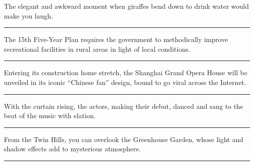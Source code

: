\documentclass[11pt,a4paper]{article}
\newcommand{\num}[1]{\makebox[1.9em][r]{#1.}\hspace{0.3em}}
\newcommand{\wline}{\noindent\rule{\linewidth}{0.4pt}}
\begin{document}
\begin{minipage}{\linewidth}

\num{34}The elegant and awkward moment when giraffes bend down to drink water would make you laugh.

\vspace{0.25em}

\wline

\end{minipage}

\begin{minipage}{\linewidth}

\num{35}The 15th Five-Year Plan requires the government to methodically improve recreational facilities in rural areas in light of local conditions.

\vspace{0.25em}

\wline

\end{minipage}

\begin{minipage}{\linewidth}

\num{36}Entering its construction home stretch, the Shanghai Grand Opera House will be unveiled in its iconic “Chinese fan” design, bound to go viral across the Internet.

\vspace{0.25em}

\wline

\end{minipage}

\vspace{0.35em}\vspace{0.15em}

\begin{minipage}{\linewidth}

\num{37}With the curtain rising, the actors, making their debut, danced and sang to the beat of the music with elation.

\vspace{0.25em}

\wline

\end{minipage}

\begin{minipage}{\linewidth}

\num{38}From the Twin Hills, you can overlook the Greenhouse Garden, whose light and shadow effects add to mysterious atmosphere.

\vspace{0.25em}

\wline

\end{minipage}
\end{document}
